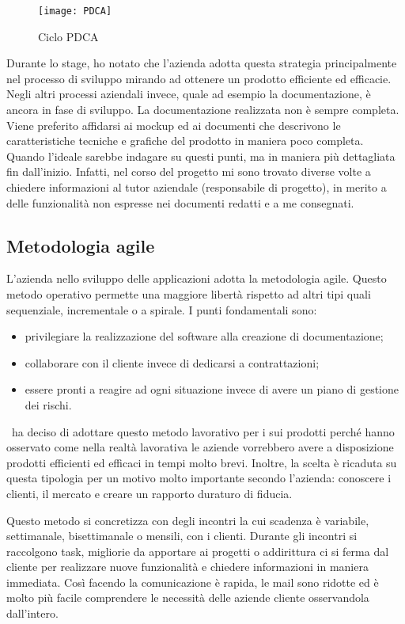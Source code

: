 \begin{figure}[!h] 
	\centering 
	\texttt{[image: PDCA]} 
	\caption{Ciclo PDCA}
\end{figure}

Durante lo stage, ho notato che l'azienda adotta questa strategia principalmente nel processo di sviluppo mirando ad ottenere un prodotto efficiente ed efficacie. Negli altri processi aziendali invece, quale ad esempio la documentazione, è ancora in fase di sviluppo. La documentazione realizzata non è sempre completa. Viene preferito affidarsi ai mock\-up ed ai documenti che descrivono le caratteristiche tecniche e grafiche del prodotto in maniera poco completa. Quando l'ideale sarebbe indagare su questi punti, ma in maniera più dettagliata fin dall'inizio. Infatti, nel corso del progetto mi sono trovato diverse volte a chiedere informazioni al tutor aziendale (responsabile di progetto), in merito a delle funzionalità non espresse nei documenti redatti e a me consegnati.  

\subsection{Metodologia agile}
\label{cap1:Metodologia agile}

L'azienda nello sviluppo delle applicazioni adotta la metodologia agile. Questo metodo operativo permette una maggiore libertà rispetto ad altri tipi quali sequenziale, incrementale o a spirale. I punti fondamentali sono:
\begin{itemize}
	\item privilegiare la realizzazione del software alla creazione di documentazione;
	\item collaborare con il cliente invece di dedicarsi a contrattazioni;
	\item essere pronti a reagire ad ogni situazione invece di avere un piano di gestione dei rischi.
\end{itemize}
\azienda\ ha deciso di adottare questo metodo lavorativo per i sui prodotti perché hanno osservato come nella realtà lavorativa le aziende vorrebbero avere a disposizione prodotti efficienti ed efficaci in tempi molto brevi. 
Inoltre, la scelta è ricaduta su questa tipologia per un motivo molto importante secondo l'azienda: conoscere i clienti, il mercato e creare un rapporto duraturo di fiducia. 

Questo metodo si concretizza con degli incontri la cui scadenza è variabile, settimanale, bisettimanale o mensili, con i clienti. Durante gli incontri si raccolgono task, migliorie da apportare ai progetti o addirittura ci si ferma dal cliente per realizzare nuove funzionalità e chiedere informazioni in maniera immediata. Così facendo la comunicazione è rapida, le mail sono ridotte ed è molto più facile comprendere le necessità delle aziende cliente osservandola dall'intero.


